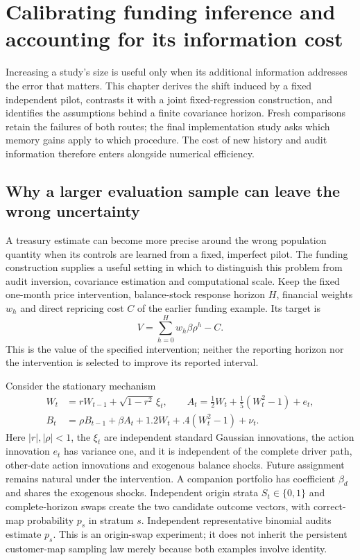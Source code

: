 \chapter{Calibrating funding inference and accounting for its information cost}
\label{v9:chapter}

Increasing a study's size is useful only when its additional information addresses the error that matters. This chapter derives the shift induced by a fixed independent pilot, contrasts it with a joint fixed-regression construction, and identifies the assumptions behind a finite covariance horizon. Fresh comparisons retain the failures of both routes; the final implementation study asks which memory gains apply to which procedure. The cost of new history and audit information therefore enters alongside numerical efficiency.

\section{Why a larger evaluation sample can leave the wrong uncertainty}
\label{v9:target}

A treasury estimate can become more precise around the wrong population
quantity when its controls are learned from a fixed, imperfect pilot. The
funding construction supplies a useful setting in which to distinguish this
problem from audit inversion, covariance estimation and computational scale.
Keep the fixed one-month price intervention, balance-stock response horizon
$H$, financial weights $w_h$ and direct repricing cost $C$ of the earlier
funding example. Its target is
\[
 V=\sum_{h=0}^{H}w_h\beta\rho^h-C.
\]
This is the value of the specified intervention; neither the reporting horizon
nor the intervention is selected to improve its reported interval.

Consider the stationary mechanism
\begin{align}
 W_t&=rW_{t-1}+\sqrt{1-r^2}\,\xi_t,\qquad
 A_t=\tfrac12W_t+\tfrac15(W_t^2-1)+e_t, \label{v9:law}\\
 B_t&=\rho B_{t-1}+\beta A_t+1.2W_t+.4(W_t^2-1)+\nu_t.
\end{align}
Here $|r|,|\rho|<1$, the $\xi_t$ are independent standard Gaussian innovations,
the action innovation $e_t$ has variance one, and it is
independent of the complete driver path, other-date action innovations and
exogenous balance shocks. Future assignment remains natural under the
intervention. A companion portfolio has coefficient $\beta_d$ and shares the
exogenous shocks. Independent origin strata $S_t\in\{0,1\}$ and complete-horizon
swaps create the two candidate outcome vectors, with correct-map probability
$p_s$ in stratum $s$. Independent representative binomial audits estimate
$p_s$. This is an origin-swap experiment; it does not inherit the persistent
customer-map sampling law merely because both examples involve identity.

